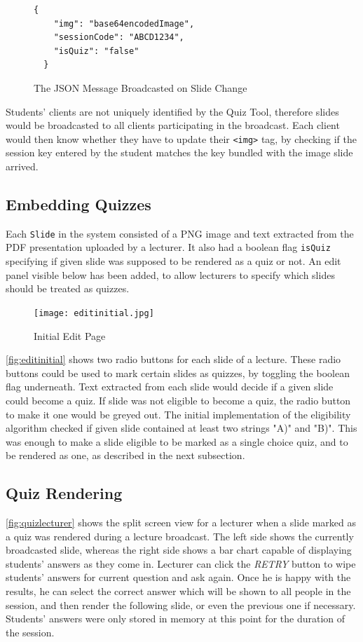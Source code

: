 \begin{figure}[h!]
  \begin{lstlisting}[basicstyle=\small]
  {
    "img": "base64encodedImage",
    "sessionCode": "ABCD1234",
    "isQuiz": "false"
  }
  \end{lstlisting}
  \caption{The JSON Message Broadcasted on Slide Change}
\end{figure}

Students' clients are not uniquely identified by the Quiz Tool, therefore slides would
be broadcasted to all clients participating in the broadcast. Each client would
then know whether they have to update their \texttt{<img>} tag, by checking
if the session key entered by the student matches the key bundled with the image slide
arrived.

\subsection{Embedding Quizzes}
Each \texttt{Slide} in the system consisted of a PNG image and text extracted
from the PDF presentation uploaded by a lecturer. It also had a boolean flag
\texttt{isQuiz} specifying if given slide was supposed to be rendered as a quiz
or not. An edit panel visible below has been added, to allow lecturers to specify
which slides should be treated as quizzes.

\begin{figure}[h!]
    \centering
    \texttt{[image: editinitial.jpg]}
    \caption{Initial Edit Page}
    \label{fig:editinitial}
\end{figure}

\newpage
\autoref{fig:editinitial} shows two radio buttons for each slide of a lecture.
These radio buttons could be used to mark certain slides as quizzes, by toggling
the boolean flag underneath. Text extracted from each slide would decide if a given
slide could become a quiz. If slide was not eligible to become a quiz, the radio button
to make it one would be greyed out. The initial implementation of the eligibility
algorithm checked if given slide contained at least two strings "A)" and "B)".
This was enough to make a slide eligible to be marked as a single choice quiz, and to be rendered as one,
as described in the next subsection.

\subsection{Quiz Rendering}
\autoref{fig:quizlecturer} shows the split screen view for a lecturer when a slide marked as a quiz was rendered
during a lecture broadcast. The left side shows the currently broadcasted slide, whereas the right
side shows a bar chart capable of displaying students' answers as they come in. Lecturer can
click the \textit{RETRY} button to wipe students' answers for current question and
ask again. Once he is happy with the results, he can select the correct answer which will
be shown to all people in the session, and then render the following slide, or even
the previous one if necessary. Students' answers were only stored in memory at this point
for the duration of the session.

